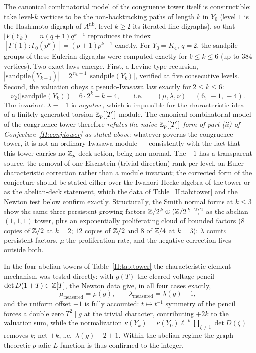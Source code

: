 \begin{remark}
\label{II:rem:iwahori}
The canonical combinatorial model of the congruence tower itself is constructible: take
level-$k$ vertices to be the non-backtracking paths of length $k$ in $Y_0$ (level $1$ is
the Hashimoto digraph of $A^{\mathrm{nb}}$, level $k\ge2$ its iterated line digraphs),
so that $|V(Y_k)|=n(q+1)q^{k-1}$ reproduces the index
$[\Gamma(1):\Gamma_0(p^k)]=(p+1)p^{k-1}$ exactly. For $Y_0=K_4$, $q=2$, the sandpile
groups of these Eulerian digraphs were computed exactly for $0\le k\le6$ (up to $384$
vertices). Two exact laws emerge. First, a Levine-type recursion,
$|\mathrm{sandpile}(Y_{k+1})|=2^{\,n_k-1}\,|\mathrm{sandpile}(Y_k)|$, verified at five
consecutive levels. Second, the valuation obeys a pseudo-Iwasawa law exactly for
$2\le k\le6$:
\[
\nu_2\bigl(|\mathrm{sandpile}(Y_k)|\bigr)=6\cdot2^k-k-4,
\qquad\text{i.e.}\qquad(\mu,\lambda,\nu)=(6,\,-1,\,-4).
\]
The invariant $\lambda=-1$ is \emph{negative}, which is impossible for the
characteristic ideal of a finitely generated torsion $\mathbb{Z}_p[[T]]$-module. The canonical
combinatorial model of the congruence tower therefore \emph{refutes the naive
$\mathbb{Z}_p[[T]]$-form of part (ii) of Conjecture~\ref{II:conj:tower} as stated above}: whatever
governs the congruence tower, it is not an ordinary Iwasawa module --- consistently with
the fact that this tower carries no $\mathbb{Z}_p$-deck action, being non-normal. The $-1$ has a
transparent source, the removal of one Eisenstein (trivial-direction) rank per level, an
Euler-characteristic correction rather than a module invariant; the corrected form of
the conjecture should be stated either over the Iwahori--Hecke algebra of the tower or
as the abelian-deck statement, which the data of Table~\ref{II:tab:tower} and the Newton
test below confirm exactly. Structurally, the Smith normal forms at $k\le3$ show the
same three persistent growing factors $\mathbb{Z}/2^{\,k}\oplus(\mathbb{Z}/2^{\,k+2})^2$ as the abelian
$(1,1,1)$ tower, plus an exponentially proliferating cloud of bounded factors ($8$
copies of $\mathbb{Z}/2$ at $k=2$; $12$ copies of $\mathbb{Z}/2$ and $8$ of $\mathbb{Z}/4$ at $k=3$): $\lambda$
counts persistent factors, $\mu$ the proliferation rate, and the negative correction
lives outside both.
\end{remark}

\begin{remark}
\label{II:rem:newton}
In the four abelian towers of Table~\ref{II:tab:tower} the characteristic-element mechanism
was tested directly: with $g(T)$ the cleared voltage pencil $\det D(1+T)\in\mathbb{Z}[T]$, the
Newton data give, in all four cases exactly,
\[
\mu_{\mathrm{measured}}=\mu(g),\qquad
\lambda_{\mathrm{measured}}=\lambda(g)-1 ,
\]
and the uniform offset $-1$ is fully accounted: $t\mapsto t^{-1}$ symmetry of the pencil
forces a double zero $T^2\mid g$ at the trivial character, contributing $+2k$ to the
valuation sum, while the normalization $\kappa(Y_k)=\kappa(Y_0)\ell^{-k}\prod_{\zeta\neq1}
\det D(\zeta)$ removes $k$; net $+k$, i.e.\ $\lambda(g)-2+1$. Within the abelian regime
the graph-theoretic $p$-adic $L$-function is thus confirmed to the integer.
\end{remark}

